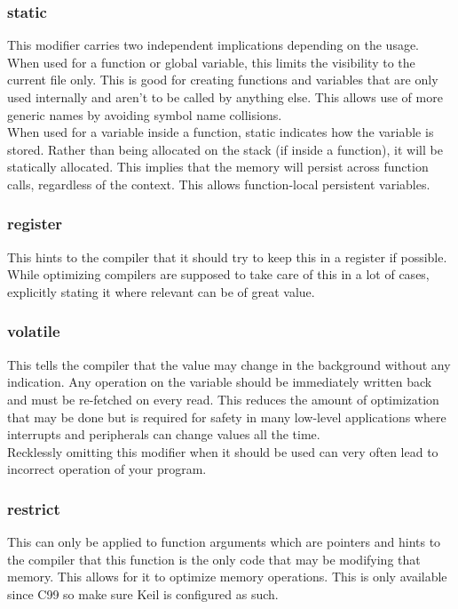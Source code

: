 \documentclass[10pt]{article}
\begin{document}
\subsubsection*{static}

This modifier carries two independent implications depending on the usage. When used for a function or global variable, this limits the visibility to the current file only. This is good for creating functions and variables that are only used internally and aren’t to be called by anything else. This allows use of more generic names by avoiding symbol name collisions. \\
When used for a variable inside a function, static indicates how the variable is stored. Rather than being allocated on the stack (if inside a function), it will be statically allocated. This implies that the memory will persist across function calls, regardless of the context. This allows function-local persistent variables.


\subsubsection*{register}

This hints to the compiler that it should try to keep this in a register if possible. While optimizing compilers are supposed to take care of this in a lot of cases, explicitly stating it where relevant can be of great value.


\subsubsection*{volatile}

This tells the compiler that the value may change in the background without any indication. Any operation on the variable should be immediately written back and must be re-fetched on every read. This reduces the amount of optimization that may be done but is required for safety in many low-level applications where interrupts and peripherals can change values all the time. \\
Recklessly omitting this modifier when it should be used can very often lead to incorrect operation of your program.


\subsubsection*{restrict}

This can only be applied to function arguments which are pointers and hints to the compiler that this function is the only code that may be modifying that memory. This allows for it to optimize memory operations. This is only available since C99 so make sure Keil is configured as such.
\end{document}
